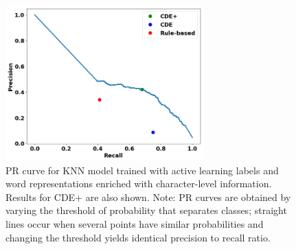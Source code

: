 \begin{figure}
\centering
\includegraphics[trim=0in 0.1in 0.1in 0.in,clip,width=3in]{figures/fasttext_prc_al_corpus_round5_CDE_rule}
\caption{PR curve for KNN model trained with active learning labels and word representations enriched with character-level information. Results for CDE+ are also shown. 
Note: PR curves are obtained by varying the threshold of probability that separates classes; straight lines occur when several points have similar probabilities and changing the threshold yields identical precision to recall ratio.
}
\label{fig:UBS_prcs_fasttext}
\end{figure}

